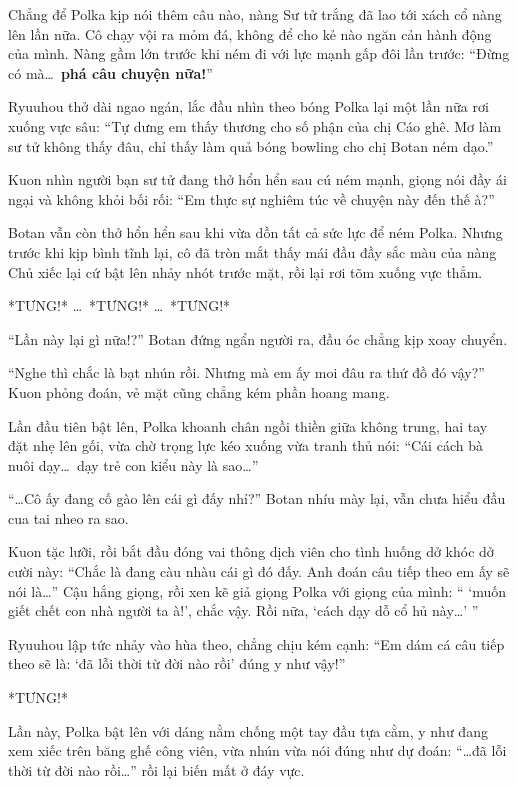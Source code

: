 \documentclass[../main.tex]{subfiles}
\begin{document}
Chẳng để Polka kịp nói thêm câu nào, nàng Sư tử trắng đã lao tới xách cổ nàng lên lần nữa. Cô chạy vội ra mỏm đá, không để cho kẻ nào ngăn cản hành động của mình. Nàng gầm lớn trước khi ném đi với lực mạnh gấp đôi lần trước: ``Đừng có mà\dots\ \textbf{phá câu chuyện nữa!}''

Ryuuhou thở dài ngao ngán, lắc đầu nhìn theo bóng Polka lại một lần nữa rơi xuống vực sâu: ``Tự dưng em thấy thương cho số phận của chị Cáo ghê. Mơ làm sư tử không thấy đâu, chỉ thấy làm quả bóng bowling cho chị Botan ném dạo.''

Kuon nhìn người bạn sư tử đang thở hổn hển sau cú ném mạnh, giọng nói đầy ái ngại và không khỏi bối rối: ``Em thực sự nghiêm túc về chuyện này đến thế à?''

Botan vẫn còn thở hổn hển sau khi vừa dồn tất cả sức lực để ném Polka. Nhưng trước khi kịp bình tĩnh lại, cô đã tròn mắt thấy mái đầu đầy sắc màu của nàng Chủ xiếc lại cứ bật lên nhảy nhót trước mặt, rồi lại rơi tõm xuống vực thẳm.


*TƯNG!* \dots\ *TƯNG!* \dots\ *TƯNG!*

``Lần này lại gì nữa!?'' Botan đứng ngẩn người ra, đầu óc chẳng kịp xoay chuyển.

``Nghe thì chắc là bạt nhún rồi. Nhưng mà em ấy moi đâu ra thứ đồ đó vậy?'' Kuon phỏng đoán, vẻ mặt cũng chẳng kém phần hoang mang.

Lần đầu tiên bật lên, Polka khoanh chân ngồi thiền giữa không trung, hai tay đặt nhẹ lên gối, vừa chờ trọng lực kéo xuống vừa tranh thủ nói: ``Cái cách bà nuôi dạy\dots\ dạy trẻ con kiểu này là sao\dots''

``\dots Cô ấy đang cố gào lên cái gì đấy nhỉ?'' Botan nhíu mày lại, vẫn chưa hiểu đầu cua tai nheo ra sao.

Kuon tặc lưỡi, rồi bắt đầu đóng vai thông dịch viên cho tình huống dở khóc dở cười này: ``Chắc là đang càu nhàu cái gì đó đấy. Anh đoán câu tiếp theo em ấy sẽ nói là\dots'' Cậu hắng giọng, rồi xen kẽ giả giọng Polka với giọng của mình: `` `muốn giết chết con nhà người ta à!', chắc vậy. Rồi nữa, `cách dạy dỗ cổ hủ này\dots' ''

Ryuuhou lập tức nhảy vào hùa theo, chẳng chịu kém cạnh: ``Em dám cá câu tiếp theo sẽ là: `đã lỗi thời từ đời nào rồi' đúng y như vậy!''

*TƯNG!*

Lần này, Polka bật lên với dáng nằm chống một tay đầu tựa cằm, y như đang xem xiếc trên băng ghế công viên, vừa nhún vừa nói đúng như dự đoán: ``\dots đã lỗi thời từ đời nào rồi\dots'' rồi lại biến mất ở đáy vực.
\end{document}
